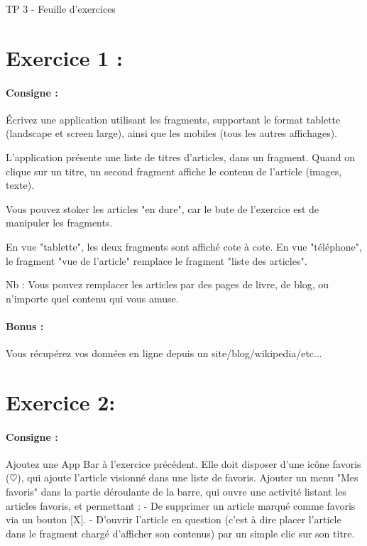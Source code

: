 \documentclass{article}
\begin{document}
\begin{center}
\large\sc TP 3 - Feuille d'exercices
\end{center}

\section{Exercice 1 :} 

\paragraph{Consigne : } Écrivez une application utilisant les fragments, supportant le format tablette (landscape et screen large), ainsi que les mobiles (tous les autres affichages).

L'application présente une liste de titres d'articles, dans un fragment. Quand on clique sur un titre, un second fragment affiche le contenu de l'article (images, texte).

Vous pouvez stoker les articles "en dure", car le bute de l'exercice est de manipuler les fragments.

En vue "tablette", les deux fragments sont affiché cote à cote.
En vue "téléphone", le fragment "vue de l'article" remplace le fragment "liste des articles".

Nb : Vous pouvez remplacer les articles par des pages de livre, de blog, ou n'importe quel contenu qui vous amuse.

\paragraph{Bonus :} Vous récupérez vos données en ligne depuis un site/blog/wikipedia/etc...


\section{Exercice 2:}
\paragraph{Consigne :} Ajoutez une App Bar à l'exercice précédent. Elle doit disposer d'une icône favoris ($\heartsuit$), qui ajoute l'article visionné dans une liste de favoris. Ajouter un menu "Mes favoris" dans la partie déroulante de la barre, qui ouvre une activité listant les articles favoris, et permettant :
- De supprimer un article marqué comme favoris via un bouton [X].
- D'ouvrir l'article en question (c'est à dire placer l'article dans le fragment chargé d'afficher son contenus) par un simple clic sur son titre.
\end{document}
